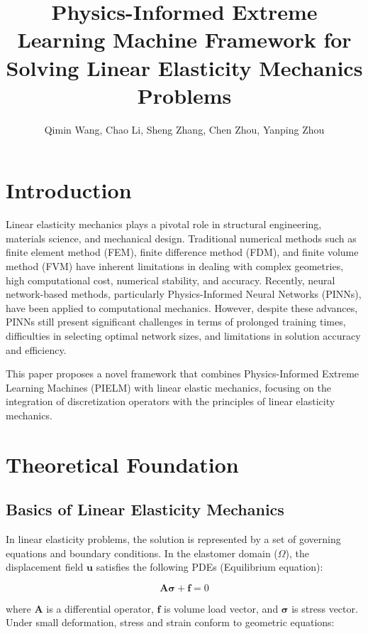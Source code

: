 \documentclass[11pt]{article}
\title{Physics-Informed Extreme Learning Machine Framework for Solving Linear Elasticity Mechanics Problems}
\author{Qimin Wang, Chao Li, Sheng Zhang, Chen Zhou, Yanping Zhou}
\date{}
\begin{document}
\maketitle

\section{Introduction}

Linear elasticity mechanics plays a pivotal role in structural engineering, materials science, and mechanical design. Traditional numerical methods such as finite element method (FEM), finite difference method (FDM), and finite volume method (FVM) have inherent limitations in dealing with complex geometries, high computational cost, numerical stability, and accuracy. Recently, neural network-based methods, particularly Physics-Informed Neural Networks (PINNs), have been applied to computational mechanics. However, despite these advances, PINNs still present significant challenges in terms of prolonged training times, difficulties in selecting optimal network sizes, and limitations in solution accuracy and efficiency.

This paper proposes a novel framework that combines Physics-Informed Extreme Learning Machines (PIELM) with linear elastic mechanics, focusing on the integration of discretization operators with the principles of linear elasticity mechanics.

\section{Theoretical Foundation}

\subsection{Basics of Linear Elasticity Mechanics}

In linear elasticity problems, the solution is represented by a set of governing equations and boundary conditions. In the elastomer domain ($\Omega$), the displacement field $\mathbf{u}$ satisfies the following PDEs (Equilibrium equation):

\begin{equation}
\mathbf{A}\boldsymbol{\sigma} + \mathbf{f} = 0
\end{equation}

where $\mathbf{A}$ is a differential operator, $\mathbf{f}$ is volume load vector, and $\boldsymbol{\sigma}$ is stress vector. Under small deformation, stress and strain conform to geometric equations:
\end{document}
